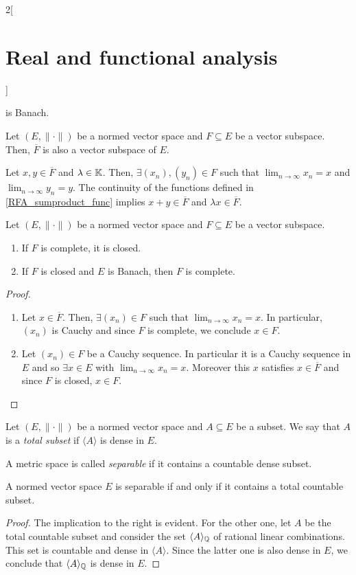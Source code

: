 \documentclass[../../../main_math.tex]{subfiles}
\begin{document}
\begin{multicols}{2}[\section{Real and functional analysis}]
\begin{proposition}
    is Banach.
  \end{proposition}
  \begin{proposition}\label{RFA_closurevectorsubspace}
    Let $(E,\|\cdot\|)$ be a normed vector space and $F\subseteq E$ be a vector subspace. Then, $\overline{F}$ is also a vector subspace of $E$.
  \end{proposition}
  \begin{sproof}
    Let $x,y\in\overline{F}$ and $\lambda\in\mathbb{K}$. Then, $\exists(x_n),(y_n)\in F$ such that $\displaystyle \lim_{n\to\infty}x_n=x$ and $\displaystyle \lim_{n\to\infty}y_n=y$. The continuity of the functions defined in \cref{RFA_sumproduct_func} implies $x+y\in\overline{F}$ and $\lambda x\in\overline{F}$.
  \end{sproof}
  \begin{proposition}
    Let $(E,\|\cdot\|)$ be a normed vector space and $F\subseteq E$ be a vector subspace.
    \begin{enumerate}
      \item If $F$ is complete, it is closed.
      \item If $F$ is closed and $E$ is Banach, then $F$ is complete.
    \end{enumerate}
  \end{proposition}
  \begin{proof}
    \begin{enumerate}
      \item Let $x\in\overline{F}$. Then, $\exists(x_n)\in F$ such that $\displaystyle \lim_{n\to\infty}x_n=x$. In particular, $(x_n)$ is Cauchy and since $F$ is complete, we conclude $x\in F$.
      \item Let $(x_n)\in F$ be a Cauchy sequence. In particular it is a Cauchy sequence in $E$ and so $\exists x\in E$ with $\displaystyle \lim_{n\to\infty}x_n=x$. Moreover this $x$ satisfies $x\in \overline{F}$ and since $F$ is closed, $x\in F$.
    \end{enumerate}
  \end{proof}
  \begin{definition}
    Let $(E,\|\cdot\|)$ be a normed vector space and $A\subseteq E$ be a subset. We say that $A$ is a \emph{total subset} if $\langle A\rangle$ is dense in $E$.
  \end{definition}
  \begin{definition}
    A metric space is called \emph{separable} if it contains a countable dense subset.
  \end{definition}
  \begin{proposition}
    A normed vector space $E$ is separable if and only if it contains a total countable subset.
  \end{proposition}
  \begin{proof}
    The implication to the right is evident. For the other one, let $A$ be the total countable subset and consider the set $\langle A\rangle_{\mathbb{Q}}$ of rational linear combinations. This set is countable and dense in $\langle A\rangle$. Since the latter one is also dense in $E$, we conclude that $\langle A\rangle_{\mathbb{Q}}$ is dense in $E$.
  \end{proof}

\end{multicols}
\end{document}
